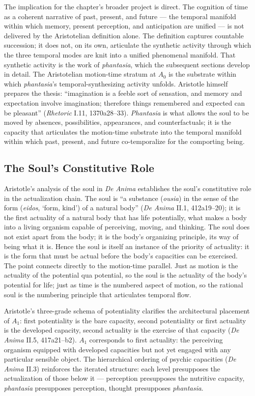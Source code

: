 The implication for the chapter's broader project is direct. The cognition of time as a coherent narrative of past, present, and future --- the temporal manifold within which memory, present perception, and anticipation are unified --- is not delivered by the Aristotelian definition alone. The definition captures countable succession; it does not, on its own, articulate the synthetic activity through which the three temporal modes are knit into a unified phenomenal manifold. That synthetic activity is the work of \textit{phantasia}, which the subsequent sections develop in detail. The Aristotelian motion-time stratum at $A_0$ is the substrate within which \textit{phantasia}'s temporal-synthesizing activity unfolds. Aristotle himself prepares the thesis: ``imagination is a feeble sort of sensation, and memory and expectation involve imagination; therefore things remembered and expected can be pleasant'' (\textit{Rhetoric} I.11, 1370a28--33). \textit{Phantasia} is what allows the soul to be moved by absences, possibilities, appearances, and counterfactuals; it is the capacity that articulates the motion-time substrate into the temporal manifold within which past, present, and future co-temporalize for the comporting being.

\subsection{The Soul's Constitutive Role}

Aristotle's analysis of the soul in \textit{De Anima} establishes the soul's constitutive role in the actualization chain. The soul is ``a substance (\textit{ousia}) in the sense of the form (\textit{eidos},  `form, kind') of a natural body'' (\textit{De Anima} II.1, 412a19--20); it is the first actuality of a natural body that has life potentially, what makes a body into a living organism capable of perceiving, moving, and thinking. The soul does not exist apart from the body; it is the body's organizing principle, its way of being what it is. Hence the soul is itself an instance of the priority of actuality: it is the form that must be actual before the body's capacities can be exercised. The point connects directly to the motion-time parallel. Just as motion is the actuality of the potential qua potential, so the soul is the actuality of the body's potential for life; just as time is the numbered aspect of motion, so the rational soul is the numbering principle that articulates temporal flow.

Aristotle's three-grade schema of potentiality clarifies the architectural placement of $A_1$: first potentiality is the bare capacity, second potentiality or first actuality is the developed capacity, second actuality is the exercise of that capacity (\textit{De Anima} II.5, 417a21--b2). $A_1$ corresponds to first actuality: the perceiving organism equipped with developed capacities but not yet engaged with any particular sensible object. The hierarchical ordering of psychic capacities (\textit{De Anima} II.3) reinforces the iterated structure: each level presupposes the actualization of those below it --- perception presupposes the nutritive capacity, \textit{phantasia} presupposes perception, thought presupposes \textit{phantasia}.

